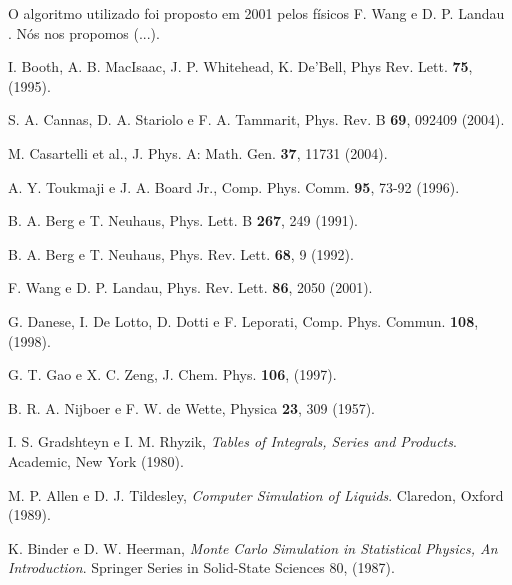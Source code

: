 \documentclass[10pt]{article}
\begin{document}
O algoritmo utilizado foi proposto em 2001 pelos f\'isicos F. Wang e D. P. Landau \cite{wanglandau}. N\'os nos propomos (...).

\renewcommand{\refname}{Refer\^encias}

\begin{thebibliography}{99}

 I. Booth, A. B. MacIsaac, J. P. Whitehead, K. De'Bell, Phys Rev. Lett. {\bf 75}, (1995).

 S. A. Cannas, D. A. Stariolo e F. A. Tammarit, Phys. Rev. B {\bf 69}, 092409 (2004).

 M. Casartelli et al., J. Phys. A: Math. Gen. {\bf 37}, 11731 (2004).

 A. Y. Toukmaji e J. A. Board Jr., Comp. Phys. Comm. {\bf 95}, 73-92 (1996).

 B. A. Berg e T. Neuhaus, Phys. Lett. B {\bf 267}, 249 (1991).

 B. A. Berg e T. Neuhaus, Phys. Rev. Lett. {\bf 68}, 9 (1992).

 F. Wang e D. P. Landau, Phys. Rev. Lett. {\bf 86}, 2050 (2001).

 G. Danese, I. De Lotto, D. Dotti e F. Leporati, Comp. Phys. Commun. {\bf 108}, (1998).

 G. T. Gao e X. C. Zeng, J. Chem. Phys. {\bf 106}, (1997).

 B. R. A. Nijboer e F. W. de Wette, Physica {\bf 23}, 309 (1957).

 I. S. Gradshteyn e I. M. Rhyzik, {\it Tables of Integrals, Series and Products}. Academic, New York (1980).

 M. P. Allen e D. J. Tildesley, {\it Computer Simulation of Liquids}. Claredon, Oxford (1989).

 K. Binder e D. W. Heerman, {\it Monte Carlo Simulation in Statistical 
Physics, An Introduction}. Springer Series in Solid-State Sciences 80, (1987).

\end{thebibliography}
\end{document}
